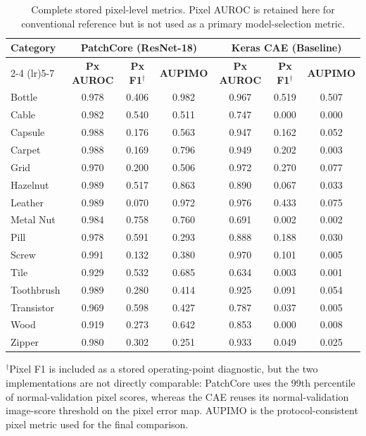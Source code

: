 \documentclass[11pt, a4paper]{article}
\begin{document}
\begin{table}[H]
\centering
\caption{Complete stored pixel-level metrics. Pixel AUROC is retained here for conventional reference but is not used as a primary model-selection metric.}
\label{tab:appendix_pixel_metrics}
\begin{tabular}{l ccc ccc}
\toprule
\multirow{2}{*}{\textbf{Category}} & \multicolumn{3}{c}{\textbf{PatchCore (ResNet-18)}} & \multicolumn{3}{c}{\textbf{Keras CAE (Baseline)}} \\
\cmidrule(lr){2-4} \cmidrule(lr){5-7}
 & \textbf{Px AUROC} & \textbf{Px F1$^{\dagger}$} & \textbf{AUPIMO} & \textbf{Px AUROC} & \textbf{Px F1$^{\dagger}$} & \textbf{AUPIMO} \\
\midrule
Bottle & 0.978 & 0.406 & 0.982 & 0.967 & 0.519 & 0.507 \\
Cable & 0.982 & 0.540 & 0.511 & 0.747 & 0.000 & 0.000 \\
Capsule & 0.988 & 0.176 & 0.563 & 0.947 & 0.162 & 0.052 \\
Carpet & 0.988 & 0.169 & 0.796 & 0.949 & 0.202 & 0.003 \\
Grid & 0.970 & 0.200 & 0.506 & 0.972 & 0.270 & 0.077 \\
Hazelnut & 0.989 & 0.517 & 0.863 & 0.890 & 0.067 & 0.033 \\
Leather & 0.989 & 0.070 & 0.972 & 0.976 & 0.433 & 0.075 \\
Metal Nut & 0.984 & 0.758 & 0.760 & 0.691 & 0.002 & 0.002 \\
Pill & 0.978 & 0.591 & 0.293 & 0.888 & 0.188 & 0.030 \\
Screw & 0.991 & 0.132 & 0.380 & 0.970 & 0.101 & 0.005 \\
Tile & 0.929 & 0.532 & 0.685 & 0.634 & 0.003 & 0.001 \\
Toothbrush & 0.989 & 0.280 & 0.414 & 0.925 & 0.091 & 0.054 \\
Transistor & 0.969 & 0.598 & 0.427 & 0.787 & 0.037 & 0.005 \\
Wood & 0.919 & 0.273 & 0.642 & 0.853 & 0.000 & 0.008 \\
Zipper & 0.980 & 0.302 & 0.251 & 0.933 & 0.049 & 0.025 \\
\bottomrule
\end{tabular}

\vspace{0.3em}
\parbox{0.96\textwidth}{\footnotesize $^{\dagger}$Pixel F1 is included as a stored operating-point diagnostic, but the two implementations are not directly comparable: PatchCore uses the 99th percentile of normal-validation pixel scores, whereas the CAE reuses its normal-validation image-score threshold on the pixel error map. AUPIMO is the protocol-consistent pixel metric used for the final comparison.}
\end{table}
\end{document}
